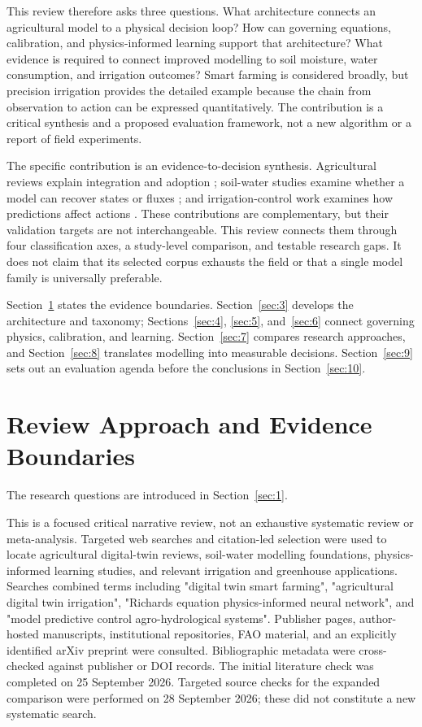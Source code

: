 \documentclass[acmsmall,screen,nonacm]{acmart}
\begin{document}
This review therefore asks three questions. What architecture connects an agricultural model to a physical decision loop? How can governing equations, calibration, and physics-informed learning support that architecture? What evidence is required to connect improved modelling to soil moisture, water consumption, and irrigation outcomes? Smart farming is considered broadly, but precision irrigation provides the detailed example because the chain from observation to action can be expressed quantitatively. The contribution is a critical synthesis and a proposed evaluation framework, not a new algorithm or a report of field experiments.


The specific contribution is an evidence-to-decision synthesis. Agricultural reviews explain integration and adoption \cite{R01,R02,R03,R04}; soil-water studies examine whether a model can recover states or fluxes \cite{R15,R16}; and irrigation-control work examines how predictions affect actions \cite{R18}. These contributions are complementary, but their validation targets are not interchangeable. This review connects them through four classification axes, a study-level comparison, and testable research gaps. It does not claim that its selected corpus exhausts the field or that a single model family is universally preferable.

Section~\ref{sec:2} states the evidence boundaries. Section~\ref{sec:3} develops the architecture and taxonomy; Sections~\ref{sec:4}, \ref{sec:5}, and~\ref{sec:6} connect governing physics, calibration, and learning. Section~\ref{sec:7} compares research approaches, and Section~\ref{sec:8} translates modelling into measurable decisions. Section~\ref{sec:9} sets out an evaluation agenda before the conclusions in Section~\ref{sec:10}.

\section{Review Approach and Evidence Boundaries}

\label{sec:2}

The research questions are introduced in Section~\ref{sec:1}.

This is a focused critical narrative review, not an exhaustive systematic review or meta-analysis. Targeted web searches and citation-led selection were used to locate agricultural digital-twin reviews, soil-water modelling foundations, physics-informed learning studies, and relevant irrigation and greenhouse applications. Searches combined terms including "digital twin smart farming", "agricultural digital twin irrigation", "Richards equation physics-informed neural network", and "model predictive control agro-hydrological systems". Publisher pages, author-hosted manuscripts, institutional repositories, FAO material, and an explicitly identified arXiv preprint were consulted. Bibliographic metadata were cross-checked against publisher or DOI records. The initial literature check was completed on 25 September 2026. Targeted source checks for the expanded comparison were performed on 28 September 2026; these did not constitute a new systematic search.
\end{document}
